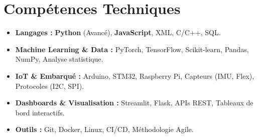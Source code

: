\documentclass[a4paper,11pt]{article}
\begin{document}
\section{Compétences Techniques}
\begin{itemize}[leftmargin=*, nosep]
    \item \small{\textbf{Langages :} \textbf{Python} (Avancé), \textbf{JavaScript}, XML, C/C++, SQL.}
    \item \small{\textbf{Machine Learning \& Data :} PyTorch, TensorFlow, Scikit-learn, Pandas, NumPy, Analyse statistique.}
    \item \small{\textbf{IoT \& Embarqué :} Arduino, STM32, Raspberry Pi, Capteurs (IMU, Flex), Protocoles (I2C, SPI).}
    \item \small{\textbf{Dashboards \& Visualisation :} Streamlit, Flask, APIs REST, Tableaux de bord interactifs.}
    \item \small{\textbf{Outils :} Git, Docker, Linux, CI/CD, Méthodologie Agile.}
\end{itemize}

\end{document}
